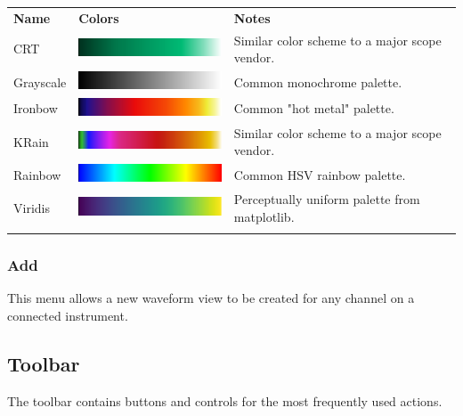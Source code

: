 \begin{tabularx}{16cm}{llX}
\thickhline
\textbf{Name} & \textbf{Colors} & \textbf{Notes} \\
\thickhline
CRT & \includegraphics[width=5cm]{images/eye-gradient-crt.png} & Similar color scheme to a major scope vendor.\\
Grayscale & \includegraphics[width=5cm]{images/eye-gradient-grayscale.png} & Common monochrome palette.\\
Ironbow & \includegraphics[width=5cm]{images/eye-gradient-ironbow.png} & Common "hot metal" palette. \\
KRain & \includegraphics[width=5cm]{images/eye-gradient-krain.png} & Similar color scheme to a major scope vendor.\\
Rainbow & \includegraphics[width=5cm]{images/eye-gradient-rainbow.png} & Common HSV rainbow palette. \\
Viridis & \includegraphics[width=5cm]{images/eye-gradient-viridis.png} & Perceptually uniform palette from matplotlib. \\
\thickhline
\end{tabularx}

\subsubsection{Add}

This menu allows a new waveform view to be created for any channel on a connected instrument.

\subsection{Toolbar}

The toolbar contains buttons and controls for the most frequently used actions.

